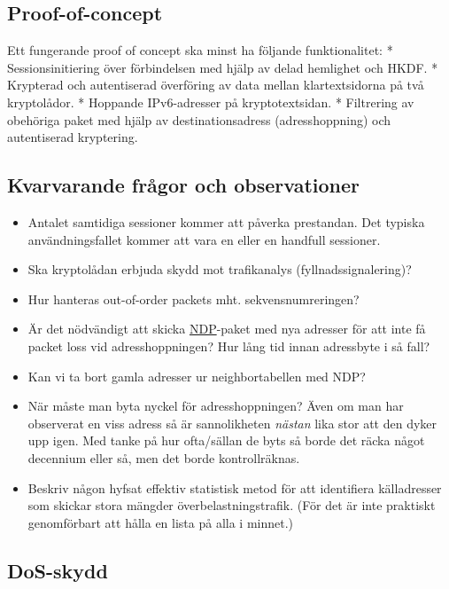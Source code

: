 \documentclass[12pt,a4paper]{article}
\providecommand{\tightlist}{%
  \setlength{\itemsep}{2pt}\setlength{\parskip}{0pt}\setlength{\partopsep}{2pt}\setlength{\topsep}{2pt}}
\begin{document}
\subsection{Proof-of-concept}\label{proof-of-concept}

Ett fungerande proof of concept ska minst ha följande funktionalitet: *
Sessionsinitiering över förbindelsen med hjälp av delad hemlighet och
HKDF. * Krypterad och autentiserad överföring av data mellan
klartextsidorna på två kryptolådor. * Hoppande IPv6-adresser på
kryptotextsidan. * Filtrering av obehöriga paket med hjälp av
destinationsadress (adresshoppning) och autentiserad kryptering.

\subsection{Kvarvarande frågor och
observationer}\label{kvarvarande-fruxe5gor-och-observationer}

\begin{itemize}
\tightlist
\item
  Antalet samtidiga sessioner kommer att påverka prestandan. Det typiska
  användningsfallet kommer att vara en eller en handfull sessioner.
\item
  Ska kryptolådan erbjuda skydd mot trafikanalys (fyllnadssignalering)?
\item
  Hur hanteras out-of-order packets mht. sekvensnumreringen?
\item
  Är det nödvändigt att skicka
  \href{https://en.wikipedia.org/wiki/Neighbor_Discovery_Protocol}{NDP}-paket
  med nya adresser för att inte få packet loss vid adresshoppningen? Hur
  lång tid innan adressbyte i så fall?
\item
  Kan vi ta bort gamla adresser ur neighbortabellen med NDP?
\item
  När måste man byta nyckel för adresshoppningen? Även om man har
  observerat en viss adress så är sannolikheten \emph{nästan} lika stor
  att den dyker upp igen. Med tanke på hur ofta/sällan de byts så borde
  det räcka något decennium eller så, men det borde kontrollräknas.
\item
  Beskriv någon hyfsat effektiv statistisk metod för att identifiera
  källadresser som skickar stora mängder överbelastningstrafik. (För det
  är inte praktiskt genomförbart att hålla en lista på alla i minnet.)
\end{itemize}

\subsection{DoS-skydd}\label{dos-skydd}
\end{document}
